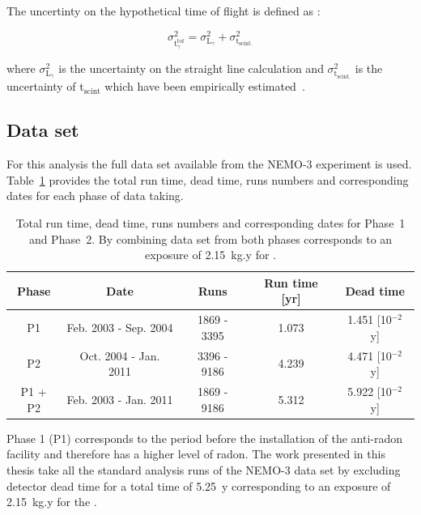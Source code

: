 \documentclass[main.tex]{subfiles}
\begin{document}
\bigskip


\NI The uncertinty on the hypothetical time of flight is defined as :  


\begin{equation}
\sigma^\text{2}_{\text{t}_\gamma^{\text{tof}}} = \sigma^\text{2}_{\text{L}_\gamma} + \sigma^\text{2}_{\text{t}_{\text{scint.}}}
\end{equation}


\bigskip


\NI where $\sigma^\text{2}_{\text{L}_\gamma}$ is the uncertainty on the straight line calculation and $\sigma^\text{2}_{\text{t}_{\text{scint.}}}$ is the uncertainty of t$_{\text{scint}}$ which have been empirically estimated~\cite{GammaReconstructionHereward}.


\FloatBarrier


\subsection{Data set}


\NI For this analysis the full data set available from the NEMO-3 experiment is used. Table~\ref{Tab:RunTimeNEMO3} provides the total run time, dead time, runs numbers and corresponding dates for each phase of data taking.


\begin{table}[h!]
\centering
\begin{tabular}{c|c|c|c|c}
Phase   & Date                  & Runs        & Run time [yr] & Dead time  \\
\toprule
P1      & Feb. 2003 - Sep. 2004 & 1869 - 3395 & 1.073         & 1.451  [10$^{-\text{2}}$ y]  \\
P2      & Oct. 2004 - Jan. 2011 & 3396 - 9186 & 4.239         & 4.471  [10$^{-\text{2}}$ y]  \\
P1 + P2 & Feb. 2003 - Jan. 2011 & 1869 - 9186 & 5.312         & 5.922  [10$^{-\text{2}}$ y]  \\
\bottomrule
\end{tabular}
\caption{Total run time, dead time, runs numbers and corresponding dates for Phase~1 and Phase~2. By combining data set from both phases corresponds to an exposure of 2.15~kg.y for \Cd.}
\label{Tab:RunTimeNEMO3}
\end{table} 


\NI Phase 1 (P1) corresponds to the period before the installation of the anti-radon facility and therefore has a higher level of radon. The work presented in this thesis take all the standard analysis runs of the NEMO-3 data set by excluding detector dead time for a total time of 5.25~y corresponding to an exposure of 2.15~kg.y for the \Cd .
\end{document}
